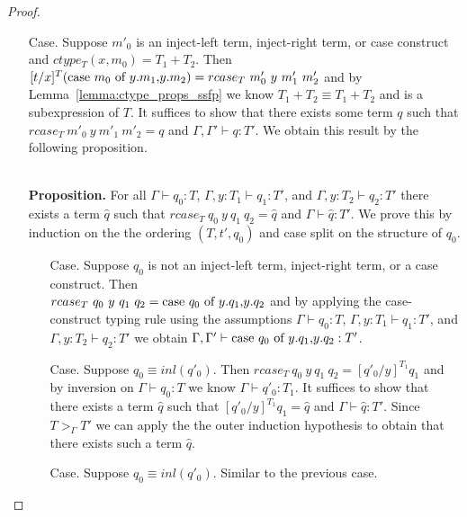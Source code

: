 \begin{proof}
\begin{itemize}
\begin{itemize}
  \item[Case.] Suppose $m'_0$ is an inject-left term, inject-right term, or case construct and $ctype_T(x,m_0) = T_1+T_2$.  Then\\
    $[t/x]^{T} (\mbox{case}\ m_0\ \text{of}\ y\text{.}m_1\text{,}y\text{.}m_2) = rcase_{T}\ m'_0\ y\ m'_1\ m'_2$ and by Lemma~\ref{lemma:ctype_props_ssfp} we know
    $T_1 + T_2 \equiv T_1+T_2$ and is a subexpression of $T$.
    It suffices to show that there exists some term
    $q$ such that $rcase_{T}\ m'_0\ y\ m'_1\ m'_2 = q$ and $\Gamma, \Gamma' \vdash q:T'$.  We obtain this
    result by the following proposition.
    
    \ \\
    {\bf Proposition.} For all $\Gamma \vdash q_0:T$, $\Gamma, y:T_1 \vdash q_1:T'$, 
    and $\Gamma, y:T_2 \vdash q_2:T'$ there exists a term $\hat{q}$ such that 
    $rcase_{T}\ q_0\ y\ q_1\ q_2 = \hat{q}$ and $\Gamma \vdash \hat{q}:T'$.  
    We prove this by induction on the the ordering $(T, t', q_0)$ and case split on the structure of $q_0$.
    \begin{itemize}
    \item[Case.] Suppose $q_0$ is not an inject-left term, inject-right term, or a case construct.  Then\\
      $rcase_{T}\ q_0\ y\ q_1\ q_2 = \mbox{case}\ q_0\ \text{of}\ y\text{.}q_1\text{,}y\text{.}q_2$ and by applying the case-construct typing rule
      using the assumptions $\Gamma \vdash q_0:T$, $\Gamma, y:T_1 \vdash q_1:T'$, 
      and $\Gamma, y:T_2 \vdash q_2:T'$ we obtain $\Gamma,\Gamma' \vdash \mbox{case}\ q_0\ \text{of}\ y\text{.}q_1\text{,}y\text{.}q_2:T'$.
      
    \item[Case.] Suppose $q_0 \equiv inl(q'_0)$.  Then $rcase_{T}\ q_0\ y\ q_1\ q_2 = [q'_0/y]^{T_1} q_1$ and
      by inversion on $\Gamma \vdash q_0:T$ we know $\Gamma \vdash q'_0:T_1$.  It suffices to show that there
      exists a term $\hat{q}$ such that $[q'_0/y]^{T_1} q_1 = \hat{q}$  and $\Gamma \vdash \hat{q}:T'$.  
      Since $T >_{\Gamma} T'$ we can apply the the outer induction hypothesis to obtain that there exists 
      such a term $\hat{q}$.
      
    \item[Case.] Suppose $q_0 \equiv inl(q'_0)$.  Similar to the previous case.
      

\end{itemize}
\end{itemize}
\end{itemize}
\end{proof}
